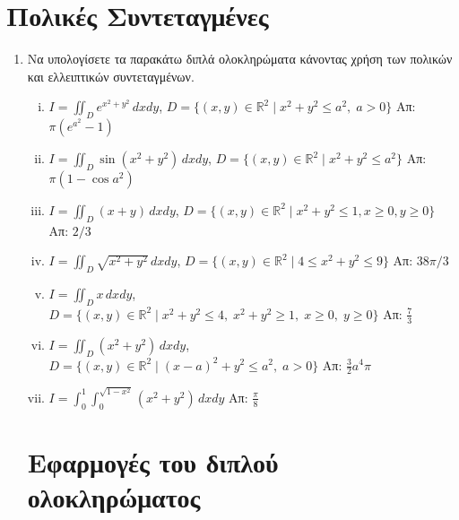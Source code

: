 



\geometry{top=2.5cm}
\pagestyle{askhseis}
\everymath{\displaystyle}





\begin{center}
  \minibox{\large\bf \textcolor{Col1}{Ασκήσεις Διπλό Ολοκλήρωμα}}
\end{center}


\section*{Πολικές Συντεταγμένες}

\begin{enumerate}
  \item Να υπολογίσετε τα παρακάτω διπλά ολοκληρώματα κάνοντας χρήση των πολικών 
    και ελλειπτικών συντεταγμένων.
    \begin{enumerate}[i)]
      \item $I=\iint_{D}e^{x^2+y^2}\,dxdy$, 
        \quad $D=\{(x,y)\in\mathbb{R}^2 \mid x^2+y^2\leq a^2,\; a>0\}$ 
        \hfill Απ: $\pi(e^{a^2}-1)$ %
      \item $I=\iint_{D}\sin(x^2+y^2)\,dxdy$, \quad $D= \{(x,y)\in \mathbb{R}^{2} 
        \mid x^{2}+y^{2} \leq a^{2} \}$ 
        \hfill Απ: $\pi (1 - \cos{a^{2}}) $
      \item $I=\iint_{D}(x+y)\,dxdy$, \quad $ D= \{(x,y)\in \mathbb{R}^{2} 
        \mid x^{2}+y^{2} \leq 1, x \geq 0, y \geq 0 \} $ 
        \hfill Απ: $2/3$
      \item $I=\iint_{D}\sqrt{x^2+y^2}\,dxdy$, \quad $ D= \{(x,y)\in \mathbb{R}^{2} 
        \mid 4 \leq x^{2}+y^{2} \leq 9 \} $ 
        \hfill Απ: $38 \pi /3$
      \item $I=\iint_{D}x\,dxdy$, \quad $ D= \{(x,y)\in \mathbb{R}^{2} \mid x^{2}+y^{2} 
        \leq 4,\; x^{2}+y^{2} \geq 1,\; x \geq 0,\; y \geq 0 \} $ 
        \hfill Απ: $ \frac{7}{3} $ %
      \item $I=\iint_{D}(x^2+y^2)\,dxdy$, \quad $ D= \{(x,y)\in \mathbb{R}^{2} 
        \mid (x-a)^{2}+y^{2} \leq a^{2},\; a>0 \}  $ 
        \hfill Απ: $\frac{3}{2}a^4\pi$
      \item $I=\int_{0}^{1} \int _{0}^{\sqrt{1-x^{2}}} (x^2+y^2)\,dxdy$ 
        \hfill Απ: $ \frac{\pi}{8} $ 
    \end{enumerate}


    \section*{Εφαρμογές του διπλού ολοκληρώματος} 


\end{enumerate}
